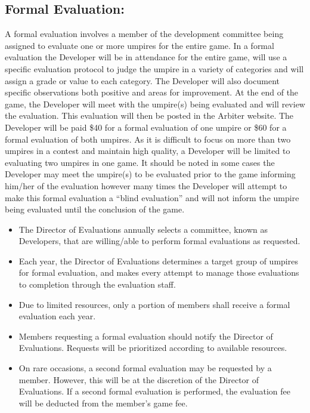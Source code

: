 \documentclass[letterpaper,11pt,colorlinks=true,allcolors=blue]{article}
\begin{document}
\subsection*{Formal Evaluation:}
A formal evaluation involves a member of the development committee being assigned to evaluate one or more umpires for the entire game. In a formal evaluation the Developer will be in attendance for the entire game, will use a specific evaluation protocol to judge the umpire in a variety of categories and will assign a grade or value to each category. The Developer will also document specific observations both positive and areas for improvement. At the end of the game, the Developer will meet with the umpire(s) being evaluated and will review the evaluation. This evaluation will then be posted in the Arbiter website. 
The Developer will be paid \$40 for a formal evaluation of one umpire or \$60 for a formal evaluation of both umpires.  As it is difficult to focus on more than two umpires in a contest and maintain high quality, a Developer will be limited to evaluating two umpires in one game.
It should be noted in some cases the Developer may meet the umpire(s) to be evaluated prior to the game informing him/her of the evaluation however many times the Developer will attempt to make this formal evaluation a “blind evaluation” and will not inform the umpire being evaluated until the conclusion of the game.
\begin{itemize}
\item  The Director of Evaluations annually selects a committee, known as Developers, that are willing/able to perform formal evaluations as requested.
\item  Each year, the Director of Evaluations determines a target group of umpires for formal evaluation, and makes every attempt to manage those evaluations to completion through the evaluation staff.
\item  Due to limited resources, only a portion of members shall receive a formal evaluation each year.
\item  Members requesting a formal evaluation should notify the Director of Evaluations.  Requests will be prioritized according to available resources.
\item  On rare occasions, a second formal evaluation may be requested by a member.  However, this will be at the discretion of the Director of Evaluations. If a second formal evaluation is performed, the evaluation fee will be deducted from the member's game fee.
\end{itemize}
\end{document}
